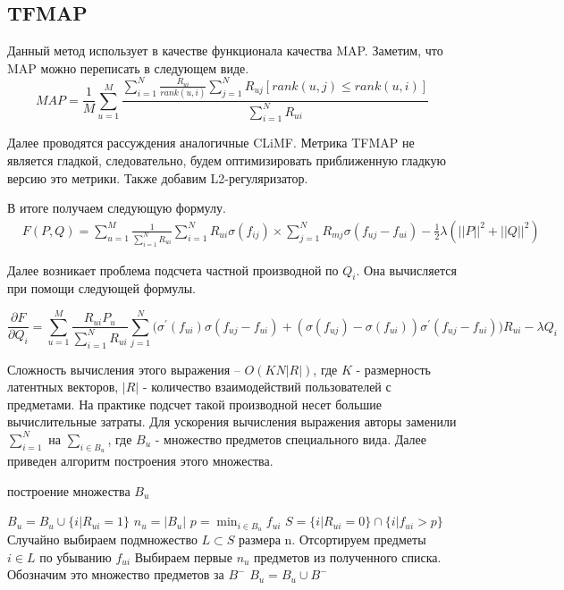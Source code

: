 \documentclass[14pt]{extarticle}
\begin{document}
\subsection{TFMAP}
Данный метод использует в качестве функционала качества MAP. Заметим, что MAP можно переписать в следующем виде. 
\begin{equation*}
 MAP = \frac{1}{M}\sum_{u=1}^M\frac{\sum_{i=1}^N \frac{R_{ui}}{rank(u, i)} \sum_{j=1}^N R_{uj} 
 [rank(u,j) \leq rank(u, i)]}{\sum_{i=1}^N R_{ui}} 
\end{equation*} 
 
 Далее проводятся рассуждения аналогичные CLiMF. Метрика TFMAP  не является гладкой, следовательно, будем оптимизировать приближенную гладкую версию это метрики. Также добавим L2-регуляризатор.
 
 В итоге получаем  следующую формулу.
 \begin{equation*}
 \begin{split}
 & F(P, Q) = \sum_{u=1}^M \frac{1}{\sum_{i=1}^N R_{ui}} \sum_{i=1}^N R_{ui} \sigma(f_{ij}) \times \sum_{j=1}^N R_{mj} \sigma(f_{uj} - f_{ui}) - \frac{1}{2}\lambda({||P||}^2 + {||Q||}^2)
 \end{split}
 \end{equation*}

Далее возникает проблема подсчета частной производной по $Q_i$. Она вычисляется при помощи следующей формулы. 

\begin{equation*}
 \frac{\partial F}{\partial Q_i} = \sum_{u=1}^M\frac{R_{ui} P_u}{\sum_{i=1}^N R_{ui}}\sum_{j=1}^N \Big(\sigma^{\prime}( f_{ui})\sigma(f_{uj} - f_{ui}) + (\sigma(f_{uj}) - \sigma(f_{ui}))\sigma^{\prime}(f_{uj} - f_{ui}) \Big )  R_{ui} - \lambda Q_i
\end{equation*}

Сложность вычисления этого выражения -- $O(KN|R|)$, где $K$ - размерность латентных векторов, $|R|$ -  количество взаимодействий пользователей с предметами. На практике подсчет такой производной несет большие вычислительные затраты. Для ускорения вычисления выражения авторы заменили $\sum_{i=1}^N$ на $\sum_{i \in B_{u}}$, где $B_{u}$ - множество предметов специального вида. Далее приведен алгоритм построения этого множества.

\begin{algorithm}[h]
\caption{построение множества $B_{u}$}
\begin{algorithmic}[1]
\State $B_u = B_u \cup \{i | R_{ui} = 1 \}$
\State $n_u = |B_u|$
\State $p = \min_{i \in B_u} f_{ui}$
\State $S  = \{i |R_{ui} = 0 \} \cap \{i| f_{ui} > p \}$
\State Случайно выбираем подмножество $L \subset S$ размера n.
\State Отсортируем предметы $i \in L$ по убыванию $f_{ui}$
\State Выбираем первые $n_u$ предметов из полученного списка. Обозначим это множество предметов за $B^{-}$
\State $B_u = B_u \cup B^{-}$  
\end{algorithmic}
\label{alg:setB}
\end{algorithm}
\end{document}
